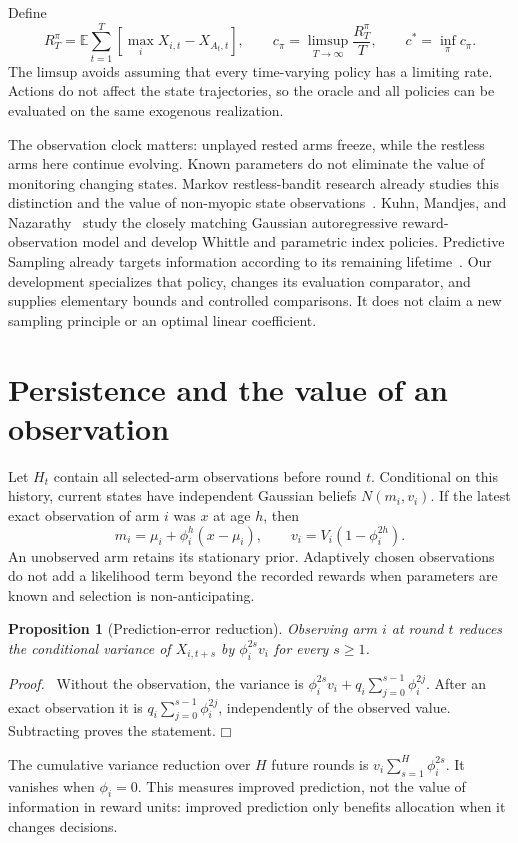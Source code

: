 \documentclass[11pt]{article}
\newtheorem{proposition}{Proposition}
\newenvironment{proof}{\par\noindent\textit{Proof.}\ }{\hfill$\mdlgwhtsquare$\par\medskip}
\newcommand{\E}{\mathbb E}
\begin{document}
Define
\begin{equation}
R_T^\pi=\E\sum_{t=1}^T[\max_iX_{i,t}-X_{A_t,t}],\qquad
c_\pi=\limsup_{T\to\infty}\frac{R_T^\pi}{T},\qquad
c^*=\inf_\pi c_\pi.
\end{equation}
The limsup avoids assuming that every time-varying policy has a limiting rate. Actions do not affect the state trajectories, so the oracle and all policies can be evaluated on the same exogenous realization.

The observation clock matters: unplayed rested arms freeze, while the restless arms here continue evolving. Known parameters do not eliminate the value of monitoring changing states. Markov restless-bandit research already studies this distinction and the value of non-myopic state observations~\cite{ortner2014}. Kuhn, Mandjes, and Nazarathy~\cite{kuhn2015} study the closely matching Gaussian autoregressive reward-observation model and develop Whittle and parametric index policies. Predictive Sampling already targets information according to its remaining lifetime~\cite{liu2023}. Our development specializes that policy, changes its evaluation comparator, and supplies elementary bounds and controlled comparisons. It does not claim a new sampling principle or an optimal linear coefficient.

\section{Persistence and the value of an observation}
Let $H_t$ contain all selected-arm observations before round $t$. Conditional on this history, current states have independent Gaussian beliefs $N(m_i,v_i)$. If the latest exact observation of arm $i$ was $x$ at age $h$, then
\begin{equation}
m_i=\mu_i+\phi_i^h(x-\mu_i),\qquad
v_i=V_i(1-\phi_i^{2h}).
\label{eq:belief}
\end{equation}
An unobserved arm retains its stationary prior. Adaptively chosen observations do not add a likelihood term beyond the recorded rewards when parameters are known and selection is non-anticipating.

\begin{proposition}[Prediction-error reduction]
Observing arm $i$ at round $t$ reduces the conditional variance of $X_{i,t+s}$ by $\phi_i^{2s}v_i$ for every $s\geq1$.
\end{proposition}
\begin{proof}
Without the observation, the variance is
$\phi_i^{2s}v_i+q_i\sum_{j=0}^{s-1}\phi_i^{2j}$.
After an exact observation it is $q_i\sum_{j=0}^{s-1}\phi_i^{2j}$, independently of the observed value. Subtracting proves the statement.
\end{proof}
The cumulative variance reduction over $H$ future rounds is $v_i\sum_{s=1}^H\phi_i^{2s}$. It vanishes when $\phi_i=0$. This measures improved prediction, not the value of information in reward units: improved prediction only benefits allocation when it changes decisions.
\end{document}
